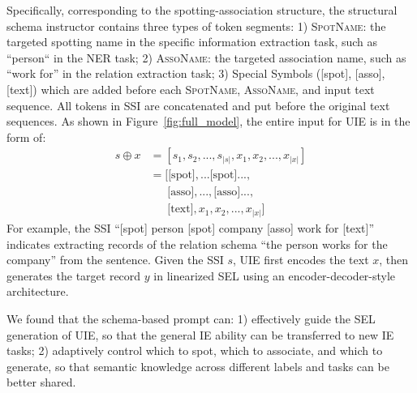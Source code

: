 \documentclass[11pt]{article}
\begin{document}
Specifically, corresponding to the spotting-association structure, the structural schema instructor contains three types of token segments:
1) \textsc{SpotName}: the targeted spotting name in the specific information extraction task, such as ``person`` in the NER task; 
2) \textsc{AssoName}: the targeted association name, such as ``work for'' in the relation extraction task;
3) Special Symbols ([spot], [asso], [text]) which are added before each \textsc{SpotName}, \textsc{AssoName}, and input text sequence.
All tokens in SSI are concatenated and put before the original text sequences.
As shown in Figure~\ref{fig:full_model}, the entire input for UIE is in the form of:
\begin{equation} \label{equ:ssi}
    \begin{aligned}
        s \oplus x & = [s_{1}, s_{2}, ..., s_{|s|}, x_{1}, x_{2}, ..., x_{|x|}] \\
         & = [\text{[spot]}, ...\text{[spot]} ...,\\
         & ~~~~~~~ \text{[asso]}, ..., \text{[asso]} ..., \\
         & ~~~~~~~ \text{[text]}, x_{1}, x_{2}, ..., x_{|x|}]
    \end{aligned}
\end{equation}
For example, the SSI ``[spot] person [spot] company [asso] work for [text]'' indicates extracting records of the relation schema ``the person works for the company'' from the sentence.
Given the SSI $s$, UIE first encodes the text $x$, then generates the target record $y$ in linearized SEL using an encoder-decoder-style architecture.

We found that the schema-based prompt can:
1) effectively guide the SEL generation of UIE, so that the general IE ability can be transferred to new IE tasks;
2) adaptively control which to spot, which to associate, and which to generate, so that semantic knowledge across different labels and tasks can be better shared.
\end{document}
